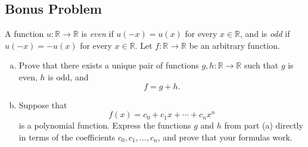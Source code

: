\documentclass[11pt]{article}
\newcommand{\R}{\mathbb{R}}
\begin{document}
\newpage
\subsection*{Bonus Problem \hfill {}}
A function $u:\R\to\R$ is \emph{even} if $u(-x)=u(x)$ for every $x\in\R$, and is \emph{odd} if $u(-x)=-u(x)$ for every $x\in\R$.
Let $f:\R\to\R$ be an arbitrary function.
\begin{enumerate}[(a)]
    \item Prove that there exists a unique pair of functions $g,h:\R\to\R$ such that $g$ is even, $h$ is odd, and
    \[
        f=g+h.
    \]

    \item Suppose that
    \[
        f(x)=c_0+c_1x+\cdots+c_nx^n
    \]
    is a polynomial function. Express the functions $g$ and $h$ from part (a) directly in terms of the coefficients $c_0,c_1,\ldots,c_n$, and prove that your formulas work.
\end{enumerate}
\end{document}
